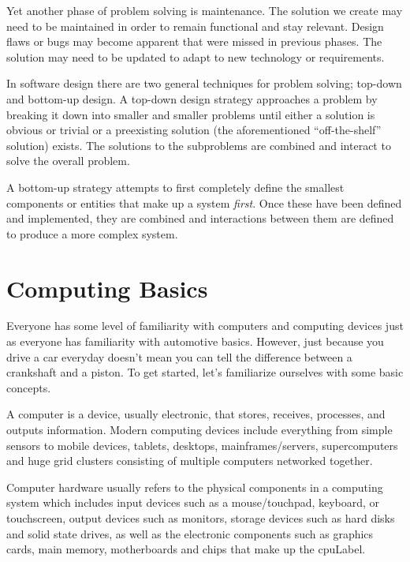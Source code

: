 Yet another phase of problem solving is maintenance.  The solution
we create may need to be maintained in order to remain functional
and stay relevant.  Design flaws or bugs may become apparent that
were missed in previous phases.  The solution may need to be updated
to adapt to new technology or requirements.  

In software design there are two general techniques for problem solving;
top-down and bottom-up design.  A \gls{top-down design}  strategy approaches a problem
by breaking it down into smaller and smaller problems until either a solution
is obvious or trivial or a preexisting solution (the aforementioned ``off-the-shelf'' 
solution) exists.  The solutions to the subproblems are combined and
interact to solve the overall problem.

A bottom-up  strategy attempts to first completely define the smallest
components or entities that make up a system \emph{first}.  Once these have
been defined and implemented, they are combined and interactions
between them are defined to produce a more complex system.

\section{Computing Basics}

Everyone has some level of familiarity with computers and computing 
devices just as everyone has familiarity with automotive basics.  However, 
just because you drive a car everyday doesn't mean you can tell the 
difference between a crankshaft and a piston.  To get started, let's familiarize
ourselves with some basic concepts.

A computer  is a device, usually electronic, that stores, receives, 
processes, and outputs information.  Modern computing devices include
everything from simple sensors to mobile devices, tablets, desktops, 
mainframes/servers, supercomputers and huge grid clusters consisting
of multiple computers networked together.

Computer hardware  usually refers to the physical components in a 
computing system which includes input devices such as a mouse/touchpad, 
keyboard, or touchscreen, output devices such as monitors, storage 
devices such as hard disks and solid state drives, as well as the
electronic components such as graphics cards, main memory, motherboards and
chips that make up the \gls{cpuLabel}.

